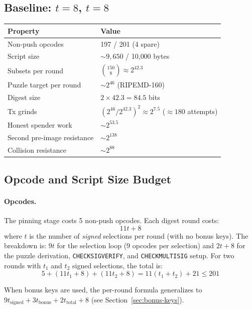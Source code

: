 \documentclass[11pt, a4paper]{article}
\begin{document}
\subsection{Baseline: $t = 8$, $t = 8$}
\label{sec:baseline}

\begin{center}
\begin{tabular}{ll}
\toprule
\textbf{Property} & \textbf{Value} \\
\midrule
Non-push opcodes & 197 / 201 (4 spare) \\
Script size & ${\sim}9{,}650$ / 10{,}000 bytes \\
\midrule
Subsets per round & $\binom{150}{8} \approx 2^{42.3}$ \\
Puzzle target per round & ${\sim}2^{46}$ (RIPEMD-160) \\
Digest size & $2 \times 42.3 = 84.5$ bits \\
\midrule
Tx grinds & $\left(2^{46} / 2^{42.3}\right)^2 \approx 2^{7.5}$ (${\approx}180$ attempts) \\
Honest spender work & ${\sim}2^{53.5}$ \\
\midrule
Second pre-image resistance & ${\sim}2^{138}$ \\
Collision resistance & ${\sim}2^{88}$ \\
\bottomrule
\end{tabular}
\end{center}

\subsection{Opcode and Script Size Budget}
\label{sec:budget}

\paragraph{Opcodes.}
The pinning stage costs 5 non-push opcodes. Each digest round costs:
$$11 t + 8$$
where $t$ is the number of \emph{signed} selections per round (with no bonus keys). The breakdown is: $9t$ for the selection loop (9 opcodes per selection) and $2t + 8$ for the puzzle derivation, \texttt{CHECKSIGVERIFY}, and \texttt{CHECKMULTISIG} setup. For two rounds with $t_1$ and $t_2$ signed selections, the total is:
$$5 + (11 t_1 + 8) + (11 t_2 + 8) = 11(t_1 + t_2) + 21 \leq 201$$

\noindent When bonus keys are used, the per-round formula generalizes to $9 t_{\mathrm{signed}} + 3 t_{\mathrm{bonus}} + 2 t_{\mathrm{total}} + 8$ (see Section~\ref{sec:bonus-keys}).
\end{document}
